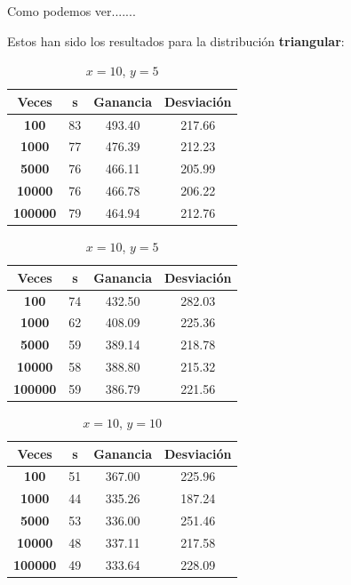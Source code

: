 \documentclass[11pt,a4paper]{report}
\begin{document}
Como podemos ver.......

Estos han sido los resultados para la distribución \textbf{triangular}:

\begin{table}[H]
	\parbox{.45\linewidth}{
	\centering
	\begin{tabular}{c|ccc}
	\textbf{Veces} & \textbf{s} & \textbf{Ganancia} & \textbf{Desviación} \\ \hline
	\textbf{100}   & 83         & 493.40            & 217.66			  \\ \hline
	\textbf{1000}  & 77         & 476.39            & 212.23			  \\ \hline
	\textbf{5000}  & 76         & 466.11            & 205.99 			  \\ \hline
	\textbf{10000} & 76         & 466.78            & 206.22			  \\ \hline
	\textbf{100000}& 79         & 464.94            & 212.76			  \\
	\end{tabular}
	\caption{$x=10$, $y=1$}
	}
	\hfill
	\parbox{.45\linewidth}{
	\centering
	\begin{tabular}{c|ccc}
	\textbf{Veces} & \textbf{s} & \textbf{Ganancia} & \textbf{Desviación} \\ \hline
	\textbf{100}   & 74         & 432.50            & 282.03			  \\ \hline
	\textbf{1000}  & 62         & 408.09            & 225.36			  \\ \hline
	\textbf{5000}  & 59         & 389.14            & 218.78 			  \\ \hline
	\textbf{10000} & 58         & 388.80            & 215.32			  \\ \hline
	\textbf{100000}& 59         & 386.79            & 221.56 			  \\
	\end{tabular}
	\caption{$x=10$, $y=5$}
	}
\end{table}
\begin{table}[H]
	\centering
	\begin{tabular}{c|ccc}
	\textbf{Veces} & \textbf{s} & \textbf{Ganancia} & \textbf{Desviación} \\ \hline
	\textbf{100}   & 51         & 367.00            & 225.96			  \\ \hline
	\textbf{1000}  & 44         & 335.26            & 187.24			  \\ \hline
	\textbf{5000}  & 53         & 336.00            & 251.46 			  \\ \hline
	\textbf{10000} & 48         & 337.11            & 217.58			  \\ \hline
	\textbf{100000}& 49         & 333.64            & 228.09			  \\
	\end{tabular}
	\caption{$x=10$, $y=10$}
\end{table}
\end{document}
